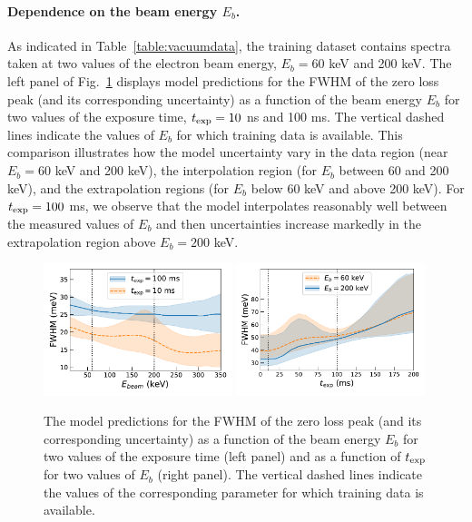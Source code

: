\paragraph{Dependence on the beam energy $E_b$.}
%
As indicated in Table~\ref{table:vacuumdata}, the training dataset contains
spectra taken at two values of the electron beam energy, $E_b=60$ keV and 200 keV.
%
The left panel of Fig.~\ref{fig:extrapolbeam} displays  model predictions for the FWHM of the zero loss peak
      (and its corresponding uncertainty) as a function of the beam energy $E_b$
      for two values of the exposure time, $t_{\rm exp}=10$ ns and 100 ms.
      The vertical dashed lines indicate the values of $E_b$ for which training data is available.
      This comparison illustrates how the model uncertainty vary in the data region
      (near $E_b=60$ keV and 200 keV), the interpolation region (for $E_b$ between 60 and 200 keV),
      and the extrapolation regions (for $E_b$ below 60 keV and above 200 keV).
      For $t_{\rm exp}=100$ ms, we observe that the model interpolates reasonably well
      between the measured values of $E_b$ and then uncertainties increase
      markedly in the extrapolation region above $E_b=200$ keV.
      
\begin{figure}[t]
    \centering
    \includegraphics[width=0.49\textwidth]{plots/Ebeam_extrapolation.pdf}
    \includegraphics[width=0.49\textwidth]{plots/time_extrapolation.pdf}
    \caption{The model predictions for the FWHM of the zero loss peak
      (and its corresponding uncertainty) as a function of the beam energy $E_b$
      for two values of the exposure time (left panel)
      and as a function of $t_{\rm exp}$ for two values of $E_b$ (right panel).
      The vertical dashed lines indicate the values of the
      corresponding parameter for which training data is available.
    }
    \label{fig:extrapolbeam}
\end{figure}

